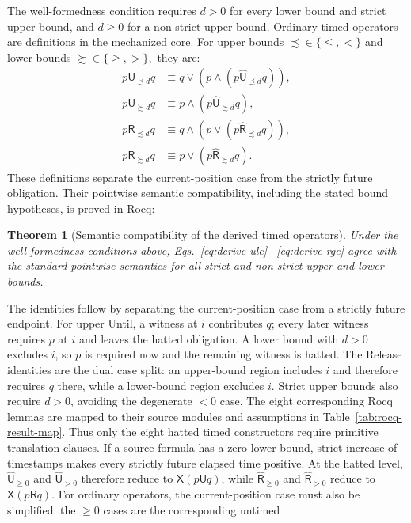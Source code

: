 \documentclass{ieeeaccess}
\newtheorem{theorem}{Theorem}[section]
\newcommand{\Until}{\mathbin{\mathsf{U}}}
\newcommand{\Release}{\mathbin{\mathsf{R}}}
\newcommand{\hUntil}{\mathbin{\widehat{\mathsf{U}}}}
\newcommand{\hRelease}{\mathbin{\widehat{\mathsf{R}}}}
\newcommand{\Next}{\mathsf{X}}
\begin{document}
The well-formedness condition requires $d>0$ for every lower bound and strict
upper bound, and $d\ge0$ for a non-strict upper bound. Ordinary timed
operators are definitions in the mechanized core. For upper bounds
$\precsim\in\{\le,<\}$ and lower bounds $\succsim\in\{\ge,>\},$ they are:
\begin{align}
p\Until_{\precsim d}q &\equiv q\lor(p\land(p\hUntil_{\precsim d}q)),\label{eq:derive-ule}\\
p\Until_{\succsim d}q &\equiv p\land(p\hUntil_{\succsim d}q),\label{eq:derive-uge}\\
p\Release_{\precsim d}q &\equiv q\land(p\lor(p\hRelease_{\precsim d}q)),\label{eq:derive-rle}\\
p\Release_{\succsim d}q &\equiv p\lor(p\hRelease_{\succsim d}q).\label{eq:derive-rge}
\end{align}
These definitions separate the current-position case from the strictly future
obligation. Their pointwise semantic compatibility, including the stated
bound hypotheses, is proved in Rocq:
\begin{theorem}[Semantic compatibility of the derived timed operators]
\label{thm:derived-semantic-compatibility}
Under the well-formedness conditions above, Eqs.~\eqref{eq:derive-ule}--
\eqref{eq:derive-rge} agree with the standard pointwise semantics for all
strict and non-strict upper and lower bounds.
\end{theorem}
The identities follow by separating the current-position case from a
strictly future endpoint. For upper Until, a witness at $i$ contributes
$q$; every later witness requires $p$ at $i$ and leaves the hatted
obligation. A lower bound with $d>0$ excludes $i$, so $p$ is required now
and the remaining witness is hatted. The Release identities are the dual
case split: an upper-bound region includes $i$ and therefore requires $q$
there, while a lower-bound region excludes $i$. Strict upper bounds also
require $d>0$, avoiding the degenerate $<0$ case. The eight corresponding
Rocq lemmas are mapped to their source modules and assumptions in
Table~\ref{tab:rocq-result-map}.
Thus only
the eight hatted timed constructors require primitive translation clauses.
If a source formula has a zero lower bound, strict increase of timestamps
makes every strictly future elapsed time positive. At the hatted level,
$\hUntil_{\ge0}$ and $\hUntil_{>0}$ therefore reduce to
$\Next(p\Until q)$, while $\hRelease_{\ge0}$ and $\hRelease_{>0}$
reduce to $\Next(p\Release q)$. For ordinary operators, the current-position
case must also be simplified: the $\ge0$ cases are the corresponding untimed
\end{document}

